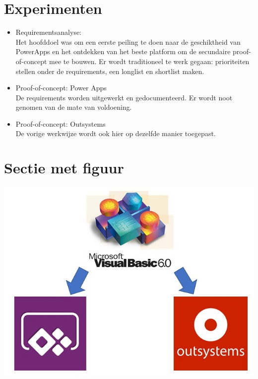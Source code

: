 \documentclass[a0,portrait]{a0poster}
\begin{document}
\begin{multicols}{2}
\section*{Experimenten}
\color{black}
\begin{itemize}
    \item Requirementsanalyse:\\
    Het hoofddoel was om een eerste peiling te doen naar de geschiktheid van PowerApps en het ontdekken van het beste platform om de secundaire proof-of-concept mee te bouwen. Er wordt traditioneel te werk gegaan: prioriteiten stellen onder de requirements, een longlist en shortlist maken.
    \item Proof-of-concept: Power Apps\\
    De requirements worden uitgewerkt en gedocumenteerd. Er wordt noot genomen van de mate van voldoening.
    \item Proof-of-concept: Outsystems\\
    De vorige werkwijze wordt ook hier op dezelfde manier toegepast.
\end{itemize}


\color{HoGentAccent1} 
\section*{Sectie met figuur}
\color{black}


\begin{center}\vspace{1cm}
\includegraphics[width=0.7\linewidth]{plat-tri}
\end{center}\vspace{1cm}


\end{multicols}
\end{document}
